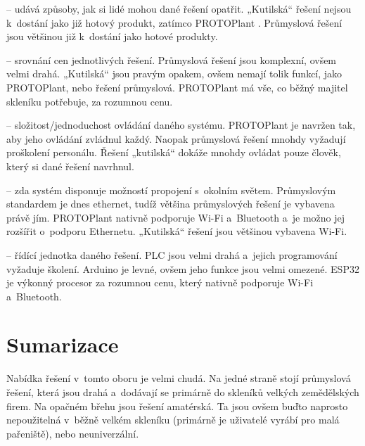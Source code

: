 \noindent{} -- udává způsoby, jak si lidé mohou dané řešení opatřit.
„Kutilská“ řešení nejsou k~dostání jako již hotový produkt, zatímco PROTO\-Plant . \newline
Průmyslová řešení jsou většinou již k~dostání jako hotové produkty. \newline

\noindent{} -- srovnání cen jednotlivých řešení.
Průmyslová řešení jsou komplexní, ovšem velmi drahá.
„Kutilská“ jsou pravým opakem, ovšem nemají tolik funkcí, jako PROTOPlant, nebo řešení průmyslová.
PROTOPlant má vše, co běžný majitel skleníku potřebuje, za rozumnou cenu. \newline

\noindent{} -- složitost/jednoduchost ovládání daného systému.
PROTOPlant je navržen tak, aby jeho ovládání zvládnul každý.
Naopak průmyslová řešení mnohdy vyžadují proškolení personálu.
Řešení „kutilská“ dokáže mnohdy ovládat pouze člověk, který si dané řešení navrhnul. \newline

\noindent{} -- zda systém disponuje možností propojení s~okolním světem.
Průmyslovým standardem je dnes ethernet, tudíž většina průmyslových řešení je vybavena právě jím.
PROTOPlant nativně podporuje Wi-Fi a~Bluetooth a~je možno jej rozšířit o~podporu Ethernetu.
„Kutilská“ řešení jsou většinou vybavena Wi-Fi. \newline

\noindent{} -- řídící jednotka daného řešení.
PLC jsou velmi drahá a~jejich programování vyžaduje školení.
Arduino je levné, ovšem jeho funkce jsou velmi omezené.
ESP32 je výkonný procesor za rozumnou cenu, který nativně podporuje Wi-Fi a~Bluetooth. \newline

\section{Sumarizace}
Nabídka řešení v~tomto oboru je velmi chudá.
Na jedné straně stojí průmyslová řešení, která jsou drahá a~dodávají se primárně do skleníků velkých zemědělských firem.
Na opačném břehu jsou řešení amatérská. 
Ta jsou ovšem buďto naprosto nepoužitelná v~běžně velkém skleníku (primárně je uživatelé vyrábí pro malá pařeniště), nebo neuniverzální.

\newpage